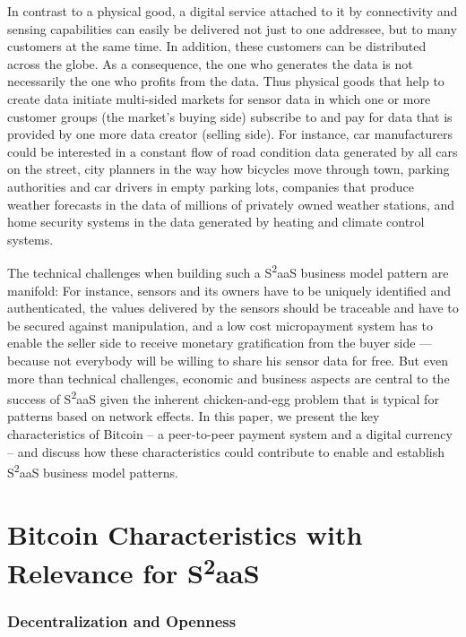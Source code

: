 In contrast to a physical good, a digital service attached to it by connectivity and sensing capabilities can easily be delivered not just to one addressee, but to many customers at the same time. In addition, these customers can be distributed across the globe. As a consequence, the one who generates the data is not necessarily the one who profits from the data. Thus physical goods that help to create data initiate multi-sided markets for sensor data in which one or more customer groups (the market’s buying side) subscribe to and pay for data that is provided by one more data creator (selling side). For instance, car manufacturers could be interested in a constant flow of road condition data generated by all cars on the street, city planners in the way how bicycles move through town, parking authorities and car drivers in empty parking lots, companies that produce weather forecasts in the data of millions of privately owned weather stations, and home security systems in the data generated by heating and climate control systems.

The technical challenges when building such a S\textsuperscript{2}aaS business model pattern are manifold: For instance, sensors and its owners have to be uniquely identified and authenticated, the values delivered by the sensors should be traceable and have to be secured against manipulation, and a low cost micropayment system has to enable the seller side to receive monetary gratification from the buyer side — because not everybody will be willing to share his sensor data for free. But even more than technical challenges, economic and business aspects are central to the success of S\textsuperscript{2}aaS \parencite{bohli2009initial} given the inherent chicken-and-egg problem that is typical for patterns based on network effects. In this paper, we present the key characteristics of Bitcoin -- a peer-to-peer payment system and a digital currency -- and discuss how these characteristics could contribute to enable and establish  S\textsuperscript{2}aaS business model patterns.

\section{Bitcoin Characteristics with Relevance for S\textsuperscript{2}aaS}

\subsubsection{Decentralization and Openness}


